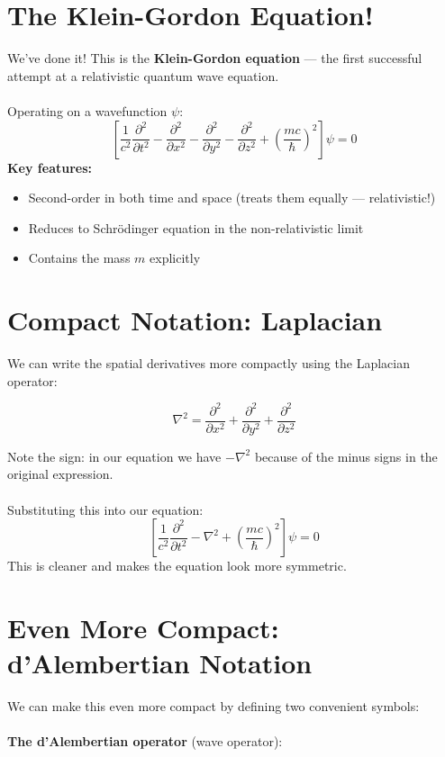 \documentclass{report}
\begin{document}
\section{The Klein-Gordon Equation!}
We've done it! This is the \textbf{Klein-Gordon equation} --- the first successful attempt at a relativistic quantum wave equation.\\
\\
Operating on a wavefunction $\psi$:
\begin{equation}
	\left[\frac{1}{c^2}\frac{\partial^2}{\partial t^2} - \frac{\partial^2}{\partial x^2} - \frac{\partial^2}{\partial y^2} - \frac{\partial^2}{\partial z^2} + \left(\frac{mc}{\hbar}\right)^2\right] \psi = 0
\end{equation}
\textbf{Key features:}
\begin{itemize}
	\item Second-order in both time and space (treats them equally --- relativistic!)
	\item Reduces to Schr\"{o}dinger equation in the non-relativistic limit
	\item Contains the mass $m$ explicitly
\end{itemize}


\section{Compact Notation: Laplacian}
We can write the spatial derivatives more compactly using the Laplacian operator:

\begin{equation}
	\nabla^2 = \frac{ \partial^2 }{ \partial x^2 } + \frac{ \partial^2 }{ \partial y^2 } + \frac{ \partial^2 }{ \partial z^2 }
\end{equation}


Note the sign: in our equation we have $-\nabla^2$ because of the minus signs in the original expression.\\
\\
Substituting this into our equation:
\begin{equation}
	\left[\frac{1}{c^2}\frac{\partial^2}{\partial t^2} - \nabla^2 + \left(\frac{mc}{\hbar}\right)^2\right]\psi = 0
\end{equation}
This is cleaner and makes the equation look more symmetric.

\section{Even More Compact: d'Alembertian Notation}
We can make this even more compact by defining two convenient symbols:\\
\\
\textbf{The d'Alembertian operator} (wave operator):
\end{document}
